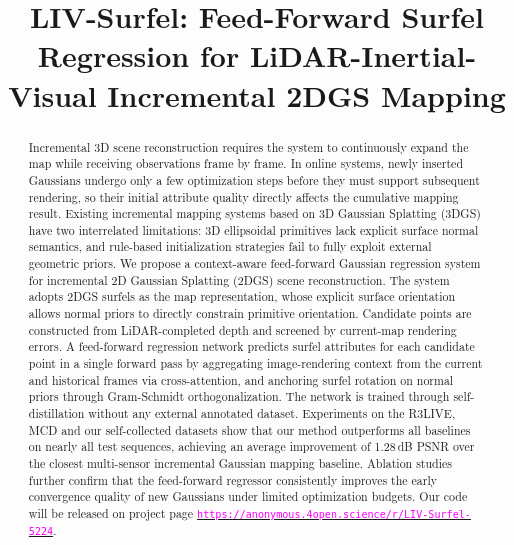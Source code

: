 \documentclass[letterpaper, 10pt, conference]{ieeeconf}
\title{\LARGE \bf LIV-Surfel: Feed-Forward Surfel Regression for LiDAR-Inertial-Visual Incremental 2DGS Mapping}
\author{}
\begin{document}
\maketitle
\thispagestyle{empty}
\pagestyle{empty}


\begin{abstract}

Incremental 3D scene reconstruction requires the system to continuously expand the map while receiving observations frame by frame. In online systems, newly inserted Gaussians undergo only a few optimization steps before they must support subsequent rendering, so their initial attribute quality directly affects the cumulative mapping result. Existing incremental mapping systems based on 3D Gaussian Splatting (3DGS) have two interrelated limitations: 3D ellipsoidal primitives lack explicit surface normal semantics, and rule-based initialization strategies fail to fully exploit external geometric priors. We propose a context-aware feed-forward Gaussian regression system for incremental 2D Gaussian Splatting (2DGS) scene reconstruction. The system adopts 2DGS surfels as the map representation, whose explicit surface orientation allows normal priors to directly constrain primitive orientation. Candidate points are constructed from LiDAR-completed depth and screened by current-map rendering errors. A feed-forward regression network predicts surfel attributes for each candidate point in a single forward pass by aggregating image-rendering context from the current and historical frames via cross-attention, and anchoring surfel rotation on normal priors through Gram-Schmidt orthogonalization. The network is trained through self-distillation without any external annotated dataset. Experiments on the R3LIVE, MCD and our self-collected datasets show that our method outperforms all baselines on nearly all test sequences, achieving an average improvement of 1.28\,dB PSNR over the closest multi-sensor incremental Gaussian mapping baseline. Ablation studies further confirm that the feed-forward regressor consistently improves the early convergence quality of new Gaussians under limited optimization budgets. Our code will be released on project page \href{https://anonymous.4open.science/r/LIV-Surfel-5224}{\textcolor{magenta}{\nolinkurl{https://anonymous.4open.science/r/LIV-Surfel-5224}}}.

\end{abstract}
\end{document}
